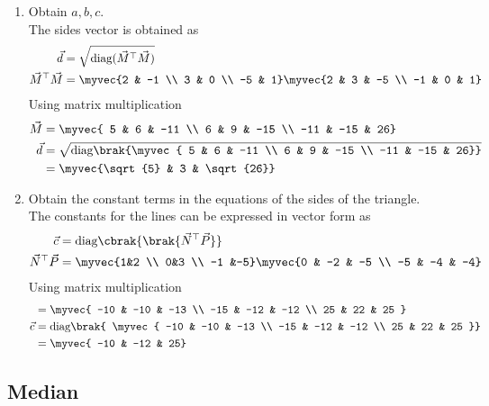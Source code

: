 \documentclass[11pt]{book}
\begin{document}
\begin{enumerate}[label=\thesubsection.\arabic*.,ref=\thesubsection.\theenumi]
\item Obtain $a, b, c$. \\
\solution The sides vector is obtained as
\begin{align}
\vec{d} &= \sqrt{\text{diag}(\vec{M}^{\top}\vec{M})}\\
\vec{M}^{\top}\vec{M} &= \myvec{2 & -1 \\ 3 & 0 \\ -5 & 1}\myvec{2 & 3 & -5 \\ -1 & 0 & 1}
\end{align} 
Using matrix multiplication 
\begin{align}
    \vec{M} &= \myvec{ 5 & 6 & -11 \\ 6 & 9 & -15 \\ -11 & -15 & 26} \\
    \vec{d} &= \sqrt{\text{diag}\brak{\myvec{ 5 & 6 & -11 \\ 6 & 9 & -15 \\ -11 & -15 & 26}}} \\
    &= \myvec{\sqrt{5} & 3 & \sqrt{26}}
\end{align}

\item Obtain the constant terms in the equations of the sides of the triangle. \\
\solution The constants for the lines can be expressed in vector form as
\begin{align}
\vec{c} &= \text{diag}\cbrak{\brak{\vec{N}^{\top}\vec{P}}}  \\
\vec{N}^{\top}\vec{P} &= \myvec{1&2 \\ 0&3 \\ -1 &-5}\myvec{0 & -2 & -5 \\ -5 & -4 & -4} \\
\end{align}
Using matrix multiplication
\begin{align}
    &=\myvec{ -10 & -10 & -13 \\ -15 & -12 & -12 \\ 25 & 22 & 25 } \\
    \vec{c} &= \text{diag}\brak{ \myvec{ -10 & -10 & -13 \\ -15 & -12 & -12 \\ 25 & 22 & 25 }} \\
    &= \myvec{ -10 & -12 & 25}
\end{align}
\end{enumerate}

\subsection{Median}
\end{document}
